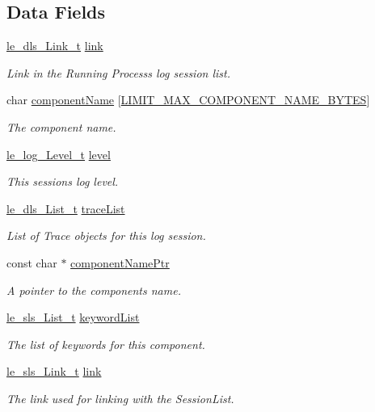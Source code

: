 \subsection*{Data Fields}
\begin{DoxyCompactItemize}
\item 
\hyperlink{structle__dls___link__t}{le\+\_\+dls\+\_\+\+Link\+\_\+t} \hyperlink{struct_log_session__t_ad3ef78eb14df999c16e47eebbc91efbd}{link}
\begin{DoxyCompactList}\small\item\em Link in the Running Process\textquotesingle{}s log session list. \end{DoxyCompactList}\item 
char \hyperlink{struct_log_session__t_a72d98b5d736a71c7ac67393f8a3236fb}{component\+Name} \mbox{[}\hyperlink{limit_8h_ac7c88dede054bbe566dd6d064a9ddb82}{L\+I\+M\+I\+T\+\_\+\+M\+A\+X\+\_\+\+C\+O\+M\+P\+O\+N\+E\+N\+T\+\_\+\+N\+A\+M\+E\+\_\+\+B\+Y\+T\+ES}\mbox{]}
\begin{DoxyCompactList}\small\item\em The component name. \end{DoxyCompactList}\item 
\hyperlink{le__log_8h_aa3de78c088c398afb23c0b582deabc0a}{le\+\_\+log\+\_\+\+Level\+\_\+t} \hyperlink{struct_log_session__t_aed5303e384a65afde9120d33d35500ea}{level}
\begin{DoxyCompactList}\small\item\em This session\textquotesingle{}s log level. \end{DoxyCompactList}\item 
\hyperlink{structle__dls___list__t}{le\+\_\+dls\+\_\+\+List\+\_\+t} \hyperlink{struct_log_session__t_a2ca5fa6e4005f1b06f3c6f07f7f1e3dc}{trace\+List}
\begin{DoxyCompactList}\small\item\em List of Trace objects for this log session. \end{DoxyCompactList}\item 
const char $\ast$ \hyperlink{struct_log_session__t_a120969e6c78dc817a06304fcde2da15e}{component\+Name\+Ptr}
\begin{DoxyCompactList}\small\item\em A pointer to the component\textquotesingle{}s name. \end{DoxyCompactList}\item 
\hyperlink{structle__sls___list__t}{le\+\_\+sls\+\_\+\+List\+\_\+t} \hyperlink{struct_log_session__t_aac5bd69dba895e16085b305969837690}{keyword\+List}
\begin{DoxyCompactList}\small\item\em The list of keywords for this component. \end{DoxyCompactList}\item 
\hyperlink{structle__sls___link__t}{le\+\_\+sls\+\_\+\+Link\+\_\+t} \hyperlink{struct_log_session__t_a375df6ec6d99194c2b55ca0588ff7610}{link}
\begin{DoxyCompactList}\small\item\em The link used for linking with the Session\+List. \end{DoxyCompactList}\end{DoxyCompactItemize}



